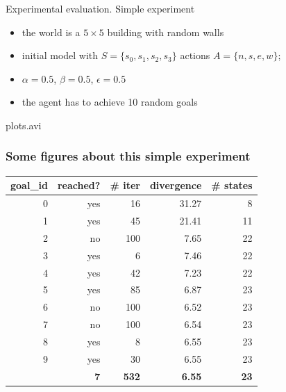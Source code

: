 \documentclass{beamer}
\begin{document}
\begin{frame}{Experimental evaluation. Simple experiment}
\begin{itemize}
\item the world is a $5\times5$ building with random walls
\item initial model with $S=\{s_0,s_1,s_2,s_3\}$ actions $A=\{n,s,e,w\}$;
\item $\alpha=0.5$, $\beta=0.5$, $\epsilon=0.5$
\item the agent has to achieve 10 random goals
\end{itemize}

 \begin{center}
    {plots.avi}
  \end{center}
\end{frame}

\begin{frame}
\frametitle{Some figures about this simple experiment}
\begin{tabular}{rrrrr} 
goal\_id & reached?  & \# iter  &  divergence&   \# states  \\ \hline 
0   &   yes &       16 &        31.27 &      8    \\ 
1   &   yes &       45 &        21.41 &     11     \\
2   &   no &      100 &         7.65 &      22     \\
3   &   yes &       6 &         7.46 &      22     \\
4   &   yes &      42 &         7.23 &      22     \\
5   &   yes &      85 &         6.87 &      23     \\
6   &   no &      100 &         6.52 &      23     \\
7   &   no &      100 &         6.54 &      23     \\
8   &   yes &       8 &         6.55 &      23     \\
9   &   yes &      30 &         6.55 &      23     \\ \hline 
    &   \bf 7 &\bf 532 & \bf 6.55 & \bf 23
\end{tabular}
\end{frame}
\end{document}
